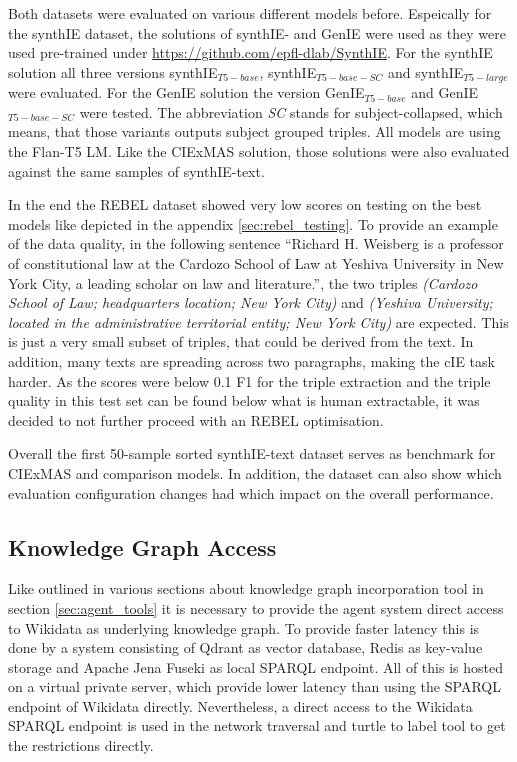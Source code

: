 \documentclass[a4paper,oneside,bibliography=totoc]{scrbook}
\begin{document}
Both datasets were evaluated on various different models before. Espeically for the synthIE dataset, the solutions of \citet{Josifoski2023} synthIE- and GenIE were used as they were used pre-trained under \url{https://github.com/epfl-dlab/SynthIE}. For the synthIE solution all three versions synthIE$_{T5-base}$, synthIE$_{T5-base-SC}$ and synthIE$_{T5-large}$ were evaluated. For the GenIE solution the version GenIE$_{T5-base}$ and GenIE$_{T5-base-SC}$ were tested. The abbreviation \textit{SC} stands for subject-collapsed, which means, that those variants outputs subject grouped triples. All models are using the Flan-T5 \ac{LM}. Like the CIExMAS solution, those solutions were also evaluated against the same samples of synthIE-text.

In the end the REBEL dataset showed very low scores on testing on the best models like depicted in the appendix \ref{sec:rebel_testing}. To provide an example of the data quality, in the following sentence \enquote{Richard H. Weisberg is a professor of constitutional law at the Cardozo School of Law at Yeshiva University in New York City, a leading scholar on law and literature.}, the two triples \textit{(Cardozo School of Law; headquarters location; New York City)} and \textit{(Yeshiva University; located in the administrative territorial entity; New York City)} are expected. This is just a very small subset of triples, that could be derived from the text. In addition, many texts are spreading across two paragraphs, making the \ac{cIE} task harder. As the scores were below 0.1 F1 for the triple extraction and the triple quality in this test set can be found below what is human extractable, it was decided to not further proceed with an REBEL optimisation.

Overall the first 50-sample sorted synthIE-text dataset serves as benchmark for CIExMAS and comparison models. In addition, the dataset can also show which evaluation configuration changes had which impact on the overall performance.

\subsection{Knowledge Graph Access}

Like outlined in various sections about knowledge graph incorporation tool in section \ref{sec:agent_tools} it is necessary to provide the agent system direct access to Wikidata as underlying knowledge graph. To provide faster latency this is done by a system consisting of Qdrant as vector database, Redis as key-value storage and Apache Jena Fuseki as local SPARQL endpoint. All of this is hosted on a virtual private server, which provide lower latency than using the SPARQL endpoint of Wikidata directly. Nevertheless, a direct access to the Wikidata SPARQL endpoint is used in the network traversal and turtle to label tool to get the restrictions directly.
\end{document}
